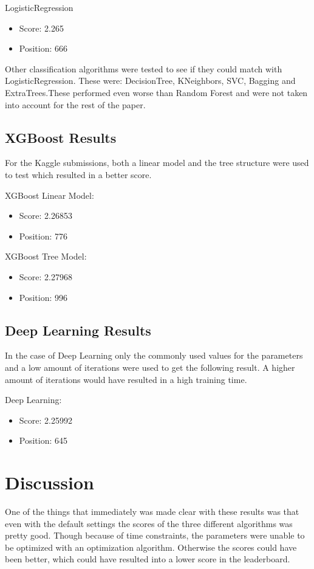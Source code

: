 \documentclass[runningheads,a4paper]{llncs}
\begin{document}
LogisticRegression
\begin{itemize}
    \item Score: 2.265
    \item Position: 666
\end{itemize}

Other classification algorithms were tested to see if they could match with LogisticRegression. These were: DecisionTree, KNeighbors, SVC, Bagging and ExtraTrees.These performed even worse than Random Forest and were not taken into account for the rest of the paper. 

\subsection{XGBoost Results}
For the Kaggle submissions, both a linear model and the tree structure were used to test which resulted in a better score.\medskip

XGBoost Linear Model:
\begin{itemize}
    \item Score: 2.26853
    \item Position: 776
\end{itemize}

XGBoost Tree Model:
\begin{itemize}
     \item Score: 2.27968
    \item Position: 996   
\end{itemize}

\subsection{Deep Learning Results}
In the case of Deep Learning only the commonly used values for the parameters and a low amount of iterations were used to get the following result. A higher amount of iterations would have resulted in a high training time.\medskip

Deep Learning:
\begin{itemize}
    \item Score: 2.25992
    \item Position: 645
\end{itemize}

\section{Discussion}
One of the things that immediately was made clear with these results was that even with the default settings the scores of the three different algorithms was pretty good. Though because of time constraints, the parameters were unable to be optimized with an optimization algorithm. Otherwise the scores could have been better, which could have resulted into a lower score in the leaderboard. 
\end{document}
